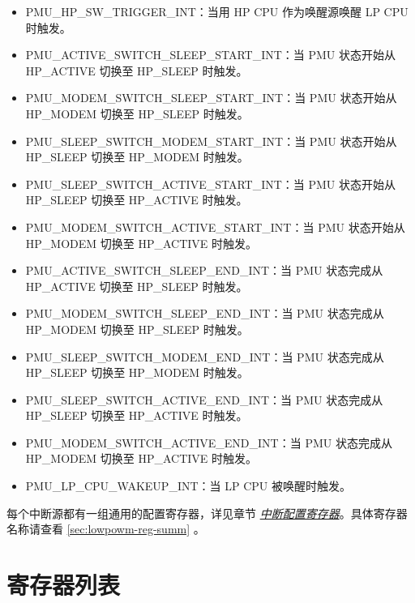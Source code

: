 \documentclass[main\_\_CN.tex]{subfiles}
\begin{document}
\begin{itemize}
\item \label{int:PMUHPSWTRIGGERINT}PMU\_HP\_SW\_TRIGGER\_INT：当用 HP CPU 作为唤醒源唤醒 LP CPU 时触发。

\item \label{int:PMUACTIVESWITCHSLEEPSTARTINT}PMU\_ACTIVE\_SWITCH\_SLEEP\_START\_INT：当 PMU 状态开始从 HP\_ACTIVE 切换至 HP\_SLEEP 时触发。
\item \label{int:PMUMODEMSWITCHSLEEPSTARTINT}PMU\_MODEM\_SWITCH\_SLEEP\_START\_INT：当 PMU 状态开始从 HP\_MODEM 切换至 HP\_SLEEP 时触发。
\item \label{int:PMUSLEEPSWITCHMODEMSTARTINT}PMU\_SLEEP\_SWITCH\_MODEM\_START\_INT：当 PMU 状态开始从 HP\_SLEEP 切换至 HP\_MODEM 时触发。
\item \label{int:PMUSLEEPSWITCHACTIVESTARTINT}PMU\_SLEEP\_SWITCH\_ACTIVE\_START\_INT：当 PMU 状态开始从 HP\_SLEEP 切换至 HP\_ACTIVE 时触发。
\item \label{int:PMUMODEMSWITCHACTIVESTARTINT}PMU\_MODEM\_SWITCH\_ACTIVE\_START\_INT：当 PMU 状态开始从 HP\_MODEM 切换至 HP\_ACTIVE 时触发。
\item \label{int:PMUACTIVESWITCHSLEEPENDINT}PMU\_ACTIVE\_SWITCH\_SLEEP\_END\_INT：当 PMU 状态完成从 HP\_ACTIVE 切换至 HP\_SLEEP 时触发。
\item \label{int:PMUMODEMSWITCHSLEEPENDINT}PMU\_MODEM\_SWITCH\_SLEEP\_END\_INT：当 PMU 状态完成从 HP\_MODEM 切换至 HP\_SLEEP 时触发。
\item \label{int:PMUSLEEPSWITCHMODEMENDINT}PMU\_SLEEP\_SWITCH\_MODEM\_END\_INT：当 PMU 状态完成从 HP\_SLEEP 切换至 HP\_MODEM 时触发。
\item \label{int:PMUSLEEPSWITCHACTIVEENDINT}PMU\_SLEEP\_SWITCH\_ACTIVE\_END\_INT：当 PMU 状态完成从 HP\_SLEEP 切换至 HP\_ACTIVE 时触发。
\item \label{int:PMUMODEMSWITCHACTIVEENDINT}PMU\_MODEM\_SWITCH\_ACTIVE\_END\_INT：当 PMU 状态完成从 HP\_MODEM 切换至 HP\_ACTIVE 时触发。
\item \label{int:PMULPCPUWAKEUPINT}PMU\_LP\_CPU\_WAKEUP\_INT：当 LP CPU 被唤醒时触发。
\end{itemize}

每个中断源都有一组通用的配置寄存器，详见章节 \hyperref[interrupt-config-registers]{\textit{中断配置寄存器}}。具体寄存器名称请查看 \ref{sec:lowpowm-reg-summ} \textit{}。


\newpage
\section{寄存器列表}\hypertarget{lowpowm-reg-summ}{}\label{sec:lowpowm-reg-summ}
\end{document}
